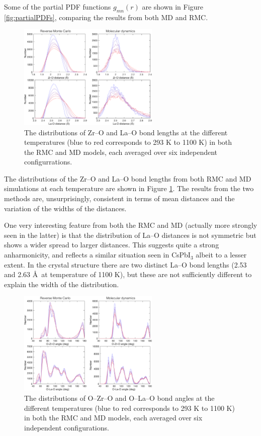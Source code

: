 \documentclass[twoside,twocolumn,9pt]{article}
\begin{document}
Some of the partial PDF functions $g_{mn}(r)$ are shown in Figure \ref{fig:partialPDFs}, comparing the results from both MD and RMC.

\begin{figure}[t]
\centering
\includegraphics[width=0.6\textwidth]{Pics/bonds.pdf}
\caption{The distributions of Zr--O and La--O bond lengths at the different temperatures (blue to red corresponds to 293 K to 1100 K) in both the RMC and MD models, each averaged over six independent configurrations.}
\label{fig:bonds}
\end{figure}

The distributions of the Zr--O and La--O bond lengths from both RMC and MD simulations at each temperature are shown in Figure \ref{fig:bonds}. The results from the two methods are, unsurprisingly, consistent in terms of mean distances and the variation of the widths of the distances.

One very interesting feature from both the RMC and MD (actually more strongly seen in the latter) is that the distribution of La--O distances is not symmetric but shows a wider spread to larger distances. This suggests quite a strong anharmonicity, and reflects a similar situation seen in CsPbI$_3$ albeit to a lesser extent. In the crystal structure there are two distinct La--O bond lengths (2.53 and 2.63 \AA\ at temperature of 1100 K), but these are not sufficiently different to explain the width of the distribution.

\begin{figure}[t]
\centering
\includegraphics[width=0.6\textwidth]{Pics/angles.pdf}
\caption{The distributions of O--Zr--O and O--La--O bond angles at the different temperatures (blue to red corresponds to 293 K to 1100 K) in both the RMC and MD models, each averaged over six independent configurations.}
\label{fig:angles}
\end{figure}
\end{document}
